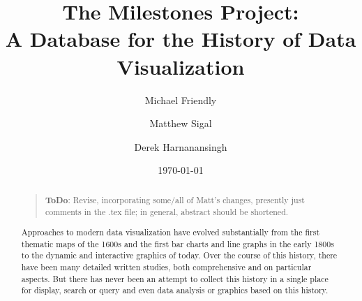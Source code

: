 \documentclass[11pt]{article}
\newcommand{\TODO}[1]{\begin{quotation}\noindent\color{blue}\textbf{ToDo}: #1\end{quotation}}
\begin{document}
\title{The Milestones Project: \\ A Database for the History of Data Visualization}
\author{Michael Friendly \and Matthew Sigal \and Derek Harnanansingh}
\date{\today}

\maketitle

\begin{abstract}
\TODO{Revise, incorporating some/all of Matt's changes, presently just comments in the .tex file; in general, abstract should be shortened.}

Approaches to modern data visualization have evolved substantially from the first thematic maps of the 1600s and the first bar charts and line graphs in the early 1800s to the dynamic and interactive graphics of today. Over the course of this history, there have been many detailed written studies, both comprehensive and on particular aspects. But there has never been an attempt to collect this history in a single place for display, search or query and even data analysis or graphics based on this history.


\end{abstract}
\end{document}
